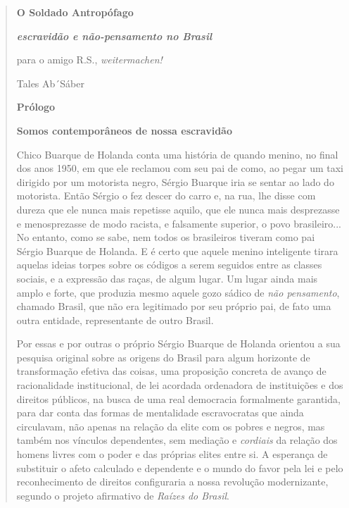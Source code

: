 \begin{quote}
\textbf{O Soldado Antropófago}

\emph{\textbf{escravidão e não-pensamento no Brasil}}

para o amigo R.S., \emph{weitermachen!}

Tales Ab´Sáber

\textbf{Prólogo}

\textbf{Somos contemporâneos de nossa escravidão}

Chico Buarque de Holanda conta uma história de quando menino, no final
dos anos 1950, em que ele reclamou com seu pai de como, ao pegar um taxi
dirigido por um motorista negro, Sérgio Buarque iria se sentar ao lado
do motorista. Então Sérgio o fez descer do carro e, na rua, lhe disse
com dureza que ele nunca mais repetisse aquilo, que ele nunca mais
desprezasse e menosprezasse de modo racista, e falsamente superior, o
povo brasileiro... No entanto, como se sabe, nem todos os brasileiros
tiveram como pai Sérgio Buarque de Holanda. E é certo que aquele menino
inteligente tirara aquelas ideias torpes sobre os códigos a serem
seguidos entre as classes sociais, e a expressão das raças, de algum
lugar. Um lugar ainda mais amplo e forte, que produzia mesmo aquele gozo
sádico de \emph{não pensamento}, chamado Brasil, que não era legitimado
por seu próprio pai, de fato uma outra entidade, representante de outro
Brasil.

Por essas e por outras o próprio Sérgio Buarque de Holanda orientou a
sua pesquisa original sobre as origens do Brasil para algum horizonte de
transformação efetiva das coisas, uma proposição concreta de avanço de
racionalidade institucional, de lei acordada ordenadora de instituições
e dos direitos públicos, na busca de uma real democracia formalmente
garantida, para dar conta das formas de mentalidade escravocratas que
ainda circulavam, não apenas na relação da elite com os pobres e negros,
mas também nos vínculos dependentes, sem mediação e \emph{cordiais} da
relação dos homens livres com o poder e das próprias elites entre si. A
esperança de substituir o afeto calculado e dependente e o mundo do
favor pela lei e pelo reconhecimento de direitos configuraria a nossa
revolução modernizante, segundo o projeto afirmativo de \emph{Raízes do
Brasil}.


\end{quote}
